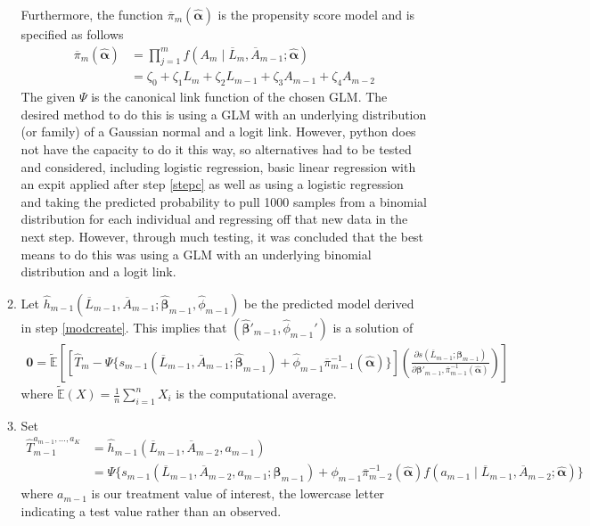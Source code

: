 \begin{enumerate}
\begin{enumerate}
Furthermore, the function $\overline{\pi}_m(\hat{\mathbf{\alpha}})$ is the propensity score model and is specified as follows
\begin{align} 
\overline{\pi}_m(\hat{\mathbf{\alpha}}) &= \prod_{j=1}^m f(A_m \mid \overline{L}_m, \overline{A}_{m-1}; \hat{\mathbf{\alpha}}) \\
&= \zeta_0 + \zeta_1 L_m + \zeta_2 L_{m-1} + \zeta_3 A_{m-1} + \zeta_4 A_{m-2}
\end{align}
The given $\Psi$ is the canonical link function of the chosen GLM.  The desired method to do this is using a GLM with an underlying distribution (or family) of a Gaussian normal and a logit link.  However, python does not have the capacity to do it this way, so alternatives had to be tested and considered, including logistic regression, basic linear regression with an expit applied after step \ref{stepc} as well as using a logistic regression and taking the predicted probability to pull 1000 samples from a binomial distribution for each individual and regressing off that new data in the next step. However, through much testing, it was concluded that the best means to do this was using a GLM with an underlying binomial distribution and a logit link.  

\item Let $ \hat{h}_{m-1}(\overline{L}_{m-1}, \overline{A}_{m-1}; \hat{\mathbf{\beta}}_{m-1}, \hat{\phi}_{m-1})$ be the predicted model derived in step \ref{modcreate}.  This implies that $(\hat{\mathbf{\beta}}'_{m-1}, \hat{\phi}_{m-1}')$ is a solution of 
\begin{align}
\mathbf{0} = \tilde{\mathbb{E}} \left[ \left[\hat{T}_{m} - \Psi \{ s_{m-1}(\overline{L}_{m-1}, \overline{A}_{m-1}; \hat{\mathbf{\beta}}_{m-1}) + \hat{\phi}_{m-1} \overline{\pi}^{-1}_{m-1}(\hat{\mathbf{\alpha}}) \} \right] \left( \frac{\partial s (\overline{L}_{m-1}; \mathbf{\beta}_{m-1})}{\partial \mathbf{\beta}'_{m-1}, \overline{\pi}^{-1}_{m-1}(\hat{\mathbf{\alpha}})} \right) \right]
\end{align}
where $\tilde{\mathbb{E}}(X) = \frac{1}{n} \sum_{i=1}^n X_i$ is the computational average.  

\item \label{stepc} Set 
\begin{align} 
\hat{T}_{m-1}^{a_{m-1}, \dots, a_K} &= \hat{h}_{m-1}(\overline{L}_{m-1}, \overline{A}_{m-2}, a_{m-1}) \\
&=  \Psi \{s_{m-1}(\overline{L}_{m-1}, \overline{A}_{m-2}, a_{m-1}; \mathbf{\beta}_{m-1}) + \phi_{m-1} \overline{\pi}_{m-2}^{-1} (\hat{\mathbf{\alpha}}) f(a_{m-1} \mid \overline{L}_{m-1}, \overline{A}_{m-2}; \hat{\mathbf{\alpha}}) \}
\end{align} 
where $a_{m-1}$ is our treatment value of interest, the lowercase letter indicating a test value rather than an observed.  
\end{enumerate}


\end{enumerate}

